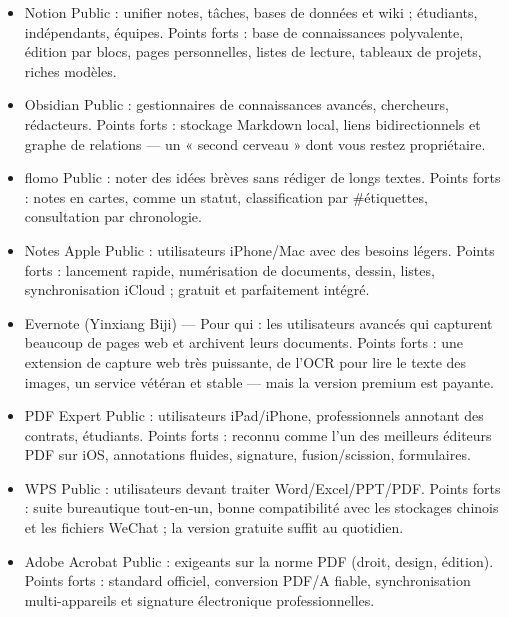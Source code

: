 \begin{itemize}
  \item Notion Public : unifier notes, tâches, bases de données et wiki ; étudiants, indépendants, équipes. Points forts : base de connaissances polyvalente, édition par blocs, pages personnelles, listes de lecture, tableaux de projets, riches modèles.
  \item Obsidian Public : gestionnaires de connaissances avancés, chercheurs, rédacteurs. Points forts : stockage Markdown local, liens bidirectionnels et graphe de relations — un « second cerveau » dont vous restez propriétaire.
  \item flomo Public : noter des idées brèves sans rédiger de longs textes. Points forts : notes en cartes, comme un statut, classification par \#étiquettes, consultation par chronologie.
  \item Notes Apple Public : utilisateurs iPhone/Mac avec des besoins légers. Points forts : lancement rapide, numérisation de documents, dessin, listes, synchronisation iCloud ; gratuit et parfaitement intégré.
  \item Evernote (Yinxiang Biji) — Pour qui : les utilisateurs avancés qui capturent beaucoup de pages web et archivent leurs documents. Points forts : une extension de capture web très puissante, de l'OCR pour lire le texte des images, un service vétéran et stable — mais la version premium est payante.
\end{itemize}


\begin{itemize}
  \item PDF Expert Public : utilisateurs iPad/iPhone, professionnels annotant des contrats, étudiants. Points forts : reconnu comme l'un des meilleurs éditeurs PDF sur iOS, annotations fluides, signature, fusion/scission, formulaires.
  \item WPS Public : utilisateurs devant traiter Word/Excel/PPT/PDF. Points forts : suite bureautique tout-en-un, bonne compatibilité avec les stockages chinois et les fichiers WeChat ; la version gratuite suffit au quotidien.
  \item Adobe Acrobat Public : exigeants sur la norme PDF (droit, design, édition). Points forts : standard officiel, conversion PDF/A fiable, synchronisation multi-appareils et signature électronique professionnelles.
\end{itemize}


